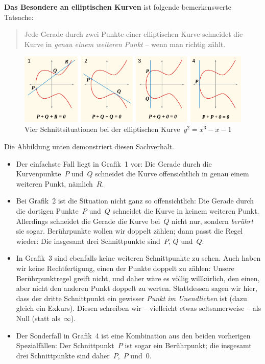 \documentclass{zirkelblatt}
\begin{document}
\textbf{Das Besondere an elliptischen Kurven} ist folgende bemerkenswerte Tatsache:
\begin{quote}
Jede Gerade durch zwei Punkte einer elliptischen Kurve schneidet die Kurve in
\emph{genau einem weiteren Punkt} -- wenn man richtig zählt.
\end{quote}
\begin{figure}[b]
  \centering
  \includegraphics[scale=0.6]{elliptic-curve-r}
  \caption{Vier Schnittsituationen bei der elliptischen Kurve~$y^2 = x^3 - x - 1$}
\end{figure}
Die Abbildung unten demonstriert diesen Sachverhalt.
\begin{itemize}
\item Der einfachste Fall liegt
in Grafik~1 vor: Die Gerade durch die Kurvenpunkte~$P$ und~$Q$ schneidet die
Kurve offensichtlich in genau einem weiteren Punkt, nämlich~$R$.
\item Bei Grafik~2
ist die Situation nicht ganz so offensichtlich: Die Gerade durch die dortigen
Punkte~$P$ und~$Q$ schneidet die Kurve in keinem weiteren Punkt. Allerdings
schneidet die Gerade die Kurve bei~$Q$ nicht nur, sondern \emph{berührt} sie
sogar. Berührpunkte wollen wir doppelt zählen; dann passt die Regel wieder: Die
insgesamt drei Schnittpunkte sind~$P$, $Q$ und~$Q$.
\item In Grafik~3 sind ebenfalls keine weiteren Schnittpunkte zu sehen. Auch
haben wir keine Rechtfertigung, einen der Punkte doppelt zu zählen: Unsere
Berührpunktregel greift nicht, und daher wäre es völlig willkürlich, den einen,
aber nicht den anderen Punkt doppelt zu werten. Stattdessen sagen wir hier,
dass der dritte Schnittpunkt ein gewisser \emph{Punkt im Unendlichen} ist (dazu
gleich ein Exkurs).
Diesen schreiben wir -- vielleicht etwas seltsamerweise -- als Null (statt
als~$\infty$).
\item Der Sonderfall in Grafik~4 ist eine Kombination aus den beiden vorherigen
Spezialfällen: Der Schnittpunkt~$P$ ist sogar ein Berührpunkt; die insgesamt
drei Schnittpunkte sind daher~$P$,~$P$ und~$0$.
\end{itemize}
\end{document}
